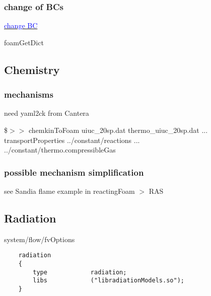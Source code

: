 \documentclass[a4paper, 12pt]{article}
\numberwithin{equation}{section}
\newcommand{\code}{\fontfamily{pcr}\selectfont}
\newcommand{\blue}[1]{\textcolor{blue}{#1}}
\begin{document}
        \subsubsection{change of BCs}

            \href{https://www.cfd-online.com/Forums/openfoam-solving/235527-how-change-boundary-condition-after-specific-timein-parallel-solver.html}{\blue{change BC}}

            foamGetDict

    \subsection{Chemistry}

        \subsubsection{mechanisms}

            need {\code yaml2ck} from Cantera

            \$$>>$ {\code chemkinToFoam uiuc\_20sp.dat thermo\_uiuc\_20sp.dat ... \\ transportProperties ../constant/reactions ... \\ ../constant/thermo.compressibleGas}

            \begin{center}
            \end{center}

        \subsubsection{possible mechanism simplification}

            see Sandia flame example in reactingFoam $>$ RAS

    \subsection{Radiation}

        {\code system/flow/fvOptions}

    {
    \begin{verbatim}
    radiation
    {
        type            radiation;
        libs            ("libradiationModels.so");
    }
    \end{verbatim}
    }
\end{document}

